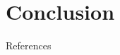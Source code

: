 \documentclass[
	11pt, compress%
]{beamer}
\begin{document}
\section{Conclusion}


\begin{frame}[allowframebreaks]{References} 
    \nocite{*}
	\tiny
    
    
\end{frame}


\end{document}
